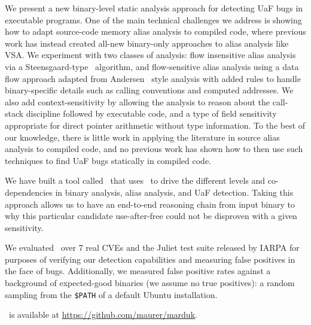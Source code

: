 We present a new binary-level static analysis approach for detecting UaF bugs in executable programs.
One of the main technical challenges we address is showing how to adapt source-code memory alias analysis to compiled code, where previous work has instead created all-new binary-only approaches to alias
analysis like VSA.
We experiment with two classes of analysis: flow insensitive alias analysis via a Steensgaard-type~\cite{steensgaard-alias} algorithm, and  flow-sensitive alias analysis using a data flow approach adapted from Andersen~\cite{andersen} style analysis with added rules to handle binary-specific details such as calling conventions and computed addresses.
We also add context-sensitivity by allowing the analysis to reason about the call-stack discipline followed by executable code, and a type of field sensitivity appropriate for direct pointer arithmetic without type information.
To the best of our knowledge, there is little work in applying the literature in source alias analysis to compiled code, and no previous work has shown how to then use such techniques to find UaF bugs statically in compiled code.

We have built a tool called \aliasname\ that uses \sysname\ to drive the different levels and co-dependencies in binary analysis, alias analysis, and UaF detection.
Taking this approach allows us to have an end-to-end reasoning chain from input binary to why this particular candidate use-after-free could not be disproven with a given sensitivity.

We evaluated \aliasname\ over 7 real CVEs and the Juliet test suite released by IARPA for purposes of verifying our detection capabilities and measuring false positives in the face of bugs.
Additionally, we measured false positive rates against a background of expected-good binaries (we assume no true positives): a random sampling from the \texttt{\$PATH} of a default Ubuntu installation.

\aliasname\ is available at \url{https://github.com/maurer/marduk}.
